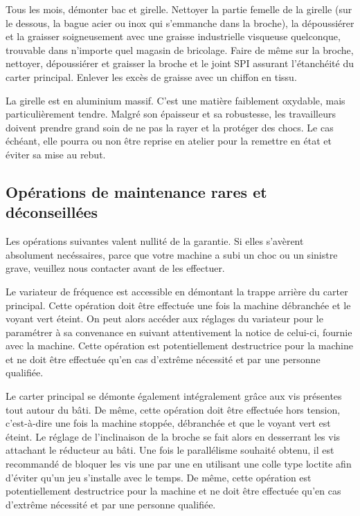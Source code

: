 \documentclass[a4paper]{article}
\begin{document}
Tous les mois, démonter bac et girelle. Nettoyer la partie femelle de la girelle (sur le dessous, la
bague acier ou inox qui s’emmanche dans la broche), la dépoussiérer et la graisser soigneusement
avec une graisse industrielle visqueuse quelconque, trouvable dans n’importe quel magasin de
bricolage. Faire de même sur la broche, nettoyer, dépoussiérer et graisser la broche et le joint SPI
assurant l’étanchéité du carter principal. Enlever les excès de graisse avec un chiffon en tissu.

La girelle est en aluminium massif. C’est une matière faiblement oxydable, mais particulièrement
tendre. Malgré son épaisseur et sa robustesse, les travailleurs doivent prendre grand soin de ne pas
la rayer et la protéger des chocs. Le cas échéant, elle pourra ou non être reprise en atelier pour la
remettre en état et éviter sa mise au rebut.

\subsection{Opérations de maintenance rares et déconseillées}
Les opérations suivantes valent nullité de la garantie. Si elles s'avèrent absolument necéssaires, parce que
votre machine a subi un choc ou un sinistre grave, veuillez nous contacter avant de les effectuer. 

Le variateur de fréquence est accessible en démontant la trappe arrière du carter principal. Cette
opération doit être effectuée une fois la machine débranchée et le voyant vert éteint. On peut alors
accéder aux réglages du variateur pour le paramétrer à sa convenance en suivant attentivement la
notice de celui-ci, fournie avec la machine. Cette opération est potentiellement destructrice pour la
machine et ne doit être effectuée qu’en cas d’extrême nécessité et par une personne qualifiée.

Le carter principal se démonte également intégralement grâce aux vis présentes tout autour du bâti.
De même, cette opération doit être effectuée hors tension, c’est-à-dire une fois la machine stoppée,
débranchée et que le voyant vert est éteint. Le réglage de l’inclinaison de la broche se fait alors en
desserrant les vis attachant le réducteur au bâti. Une fois le parallélisme souhaité obtenu, il est
recommandé de bloquer les vis une par une en utilisant une colle type loctite afin d’éviter qu’un jeu
s’installe avec le temps. De même, cette opération est potentiellement destructrice pour la machine
et ne doit être effectuée qu’en cas d’extrême nécessité et par une personne qualifiée. 
\end{document}
